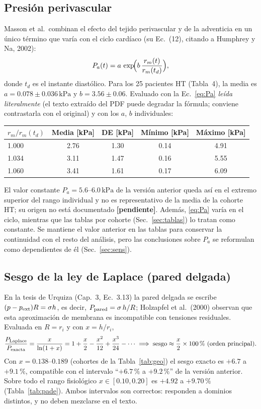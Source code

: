 \documentclass[11pt]{article}
\newcommand{\kPa}{\,\mathrm{kPa}}
\newcommand{\pend}{\textcolor{red!70!black}{\textbf{[pendiente]}}}
\begin{document}
\subsection{Presión perivascular}
Masson et al.\ combinan el efecto del tejido perivascular y de la adventicia en un único término que varía con el ciclo cardíaco (su Ec.~(12), citando a Humphrey y Na, 2002):
\begin{equation}
P_a(t)=a\,\exp\!\Bigl(b\,\frac{r_m(t)}{r_m(t_d)}\Bigr),
\label{eq:Pa}
\end{equation}
donde $t_d$ es el instante diastólico. Para los 25 pacientes HT (Tabla~4), la media es $a=0.078\pm0.036\kPa$ y $b=3.56\pm0.06$. Evaluado con la Ec.~\eqref{eq:Pa} \emph{leída literalmente} (el texto extraído del PDF puede degradar la fórmula; conviene contrastarla con el original) y con los $a$, $b$ individuales:
\begin{center}\small
\begin{tabular}{lcccc}\toprule
$r_m/r_m(t_d)$ & Media [kPa] & DE [kPa] & Mínimo [kPa] & Máximo [kPa]\\\midrule
1.000 & 2.76 & 1.30 & 0.14 & 4.91\\
1.034 & 3.11 & 1.47 & 0.16 & 5.55\\
1.060 & 3.41 & 1.61 & 0.17 & 6.09\\\bottomrule
\end{tabular}
\end{center}
El valor constante $P_a=5.6$--$6.0\kPa$ de la versión anterior queda así en el extremo superior del rango individual y no es representativo de la media de la cohorte HT; su origen no está documentado \pend. Además, \eqref{eq:Pa} varía en el ciclo, mientras que las tablas por cohorte (Sec.~\ref{sec:tablas}) lo tratan como constante. Se mantiene el valor anterior en las tablas para conservar la continuidad con el resto del análisis, pero las conclusiones sobre $P_a$ se reformulan como dependientes de él (Sec.~\ref{sec:sens}).

\subsection{Sesgo de la ley de Laplace (pared delgada)}
En la tesis de Urquiza (Cap.~3, Ec.~3.13) la pared delgada se escribe $(p-p_{\rm ext})R=\sigma h$, es decir, $P_{\rm pared}=\sigma\,h/R$; Holzapfel et al.\ (2000) observan que esta aproximación de membrana es incompatible con tensiones residuales. Evaluada en $R=r_i$ y con $x=h/r_i$,
\begin{equation}
\frac{P_{\rm Laplace}}{P_{\rm exacta}}=\frac{x}{\ln(1+x)}=1+\frac{x}{2}-\frac{x^{2}}{12}+\frac{x^{3}}{24}-\cdots
\;\Longrightarrow\;\text{sesgo}\approx\frac{x}{2}\times100\,\%\ (\text{orden principal}).
\label{eq:laplace}
\end{equation}
Con $x=0.138$--$0.189$ (cohortes de la Tabla~\ref{tab:geo}) el sesgo exacto es $+6.7$ a $+9.1\,\%$, compatible con el intervalo ``$+6.7\,\%$ a $+9.2\,\%$'' de la versión anterior. Sobre todo el rango fisiológico $x\in[0.10,0.20]$ es $+4.92$ a $+9.70\,\%$ (Tabla~\ref{tab:pade}). Ambos intervalos son correctos: responden a dominios distintos, y no deben mezclarse en el texto.
\end{document}
